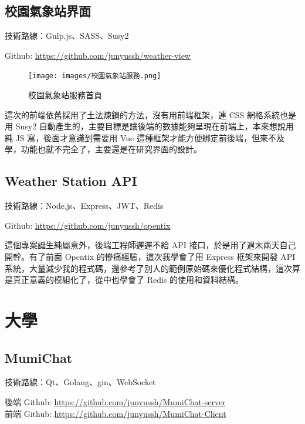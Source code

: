 \documentclass[classical]{einfart}
\begin{document}
\subsection{校園氣象站界面}

技術路線：Gulp.js、SASS、Susy2

Github: \url{https://github.com/junyussh/weather-view}

\begin{figure}[H]
    \centering
    \texttt{[image: images/校園氣象站服務.png]}
    \caption{校園氣象站服務首頁}
\end{figure}

這次的前端依舊採用了土法煉鋼的方法，沒有用前端框架，連 CSS
網格系統也是用 Susy2
自動產生的，主要目標是讓後端的數據能夠呈現在前端上，本來想說用純 JS
寫，後面才意識到需要用 Vue
這種框架才能方便綁定前後端，但來不及學，功能也就不完全了，主要還是在研究界面的設計。

\subsection{Weather Station API}

技術路線：Node.js、Express、JWT、Redis

Github: \url{https://github.com/junyussh/opentix}

這個專案誕生純屬意外，後端工程師遲遲不給 API
接口，於是用了週末兩天自己開幹。有了前面 Opentix
的慘痛經驗，這次我學會了用 Express 框架來開發 API
系統，大量減少我的程式碼，還參考了別人的範例原始碼來優化程式結構，這次算是真正意義的模組化了，從中也學會了
Redis 的使用和資料結構。

\section{大學}

\subsection{MumiChat}

技術路線：Qt、Golang、gin、WebSocket

後端 Github: \url{https://github.com/junyussh/MumiChat-server}\\
前端 Github: \url{https://github.com/junyussh/MumiChat-Client}
\end{document}
